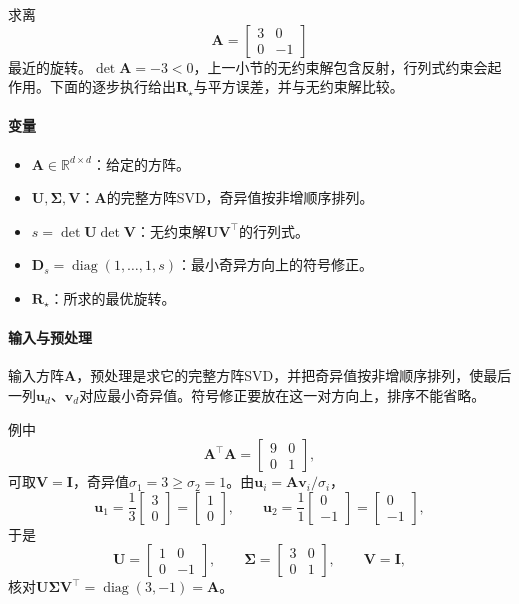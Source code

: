 \begin{example}[对角矩阵的旋转逼近]
\label{ex:matrix-approximation-rotation-diagonal}
求离
\[
 \bm A=\begin{bmatrix}3&0\\0&-1\end{bmatrix}
\]
最近的旋转。$\det\bm A=-3<0$，上一小节的无约束解包含反射，行列式约束会起作用。下面的逐步执行给出$\bm R_\star$与平方误差，并与无约束解比较。
\end{example}

\paragraph{变量}
\begin{itemize}
 \item $\bm A\in\mathbb R^{d\times d}$：给定的方阵。
 \item $\bm U,\bm\Sigma,\bm V$：$\bm A$的完整方阵SVD，奇异值按非增顺序排列。
 \item $s=\det\bm U\det\bm V$：无约束解$\bm U\bm V^\top$的行列式。
 \item $\bm D_s=\operatorname{diag}(1,\ldots,1,s)$：最小奇异方向上的符号修正。
 \item $\bm R_\star$：所求的最优旋转。
\end{itemize}

\paragraph{输入与预处理}
输入方阵$\bm A$，预处理是求它的完整方阵SVD，并把奇异值按非增顺序排列，使最后一列$\bm u_d$、$\bm v_d$对应最小奇异值。符号修正要放在这一对方向上，排序不能省略。

例中
\[
 \bm A^\top\bm A=\begin{bmatrix}9&0\\0&1\end{bmatrix},
\]
可取$\bm V=\bm I$，奇异值$\sigma_1=3\geq\sigma_2=1$。由$\bm u_i=\bm A\bm v_i/\sigma_i$，
\[
 \bm u_1=\frac13\begin{bmatrix}3\\0\end{bmatrix}=\begin{bmatrix}1\\0\end{bmatrix},\qquad
 \bm u_2=\frac11\begin{bmatrix}0\\-1\end{bmatrix}=\begin{bmatrix}0\\-1\end{bmatrix},
\]
于是
\[
 \bm U=\begin{bmatrix}1&0\\0&-1\end{bmatrix},\qquad
 \bm\Sigma=\begin{bmatrix}3&0\\0&1\end{bmatrix},\qquad
 \bm V=\bm I ,
\]
核对$\bm U\bm\Sigma\bm V^\top=\operatorname{diag}(3,-1)=\bm A$。

